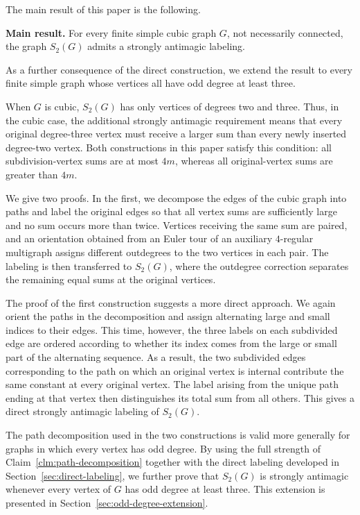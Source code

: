 \documentclass[preprint,12pt]{elsarticle}
\begin{document}
The main result of this paper is the following.

\medskip
\noindent\textbf{Main result.}
For every finite simple cubic graph \(G\), not necessarily connected, the
graph \(S_2(G)\) admits a strongly antimagic labeling.
\medskip

As a further consequence of the direct construction, we extend the result
to every finite simple graph whose vertices all have odd degree at least
three.

When \(G\) is cubic, \(S_2(G)\) has only vertices of degrees two and
three. Thus, in the cubic case, the additional strongly antimagic
requirement means that every original degree-three vertex must receive a
larger sum than every newly inserted degree-two vertex. Both constructions
in this paper satisfy this condition: all subdivision-vertex sums are at
most \(4m\), whereas all original-vertex sums are greater than \(4m\).

We give two proofs. In the first, we decompose the edges of the cubic
graph into paths and label the original edges so that all vertex sums are
sufficiently large and no sum occurs more than twice. Vertices receiving
the same sum are paired, and an orientation obtained from an Euler tour of
an auxiliary \(4\)-regular multigraph assigns different outdegrees to the
two vertices in each pair. The labeling is then transferred to \(S_2(G)\),
where the outdegree correction separates the remaining equal sums at the
original vertices.

The proof of the first construction suggests a more direct approach. We
again orient the paths in the decomposition and assign alternating large
and small indices to their edges. This time, however, the three labels on
each subdivided edge are ordered according to whether its index comes from
the large or small part of the alternating sequence. As a result, the two
subdivided edges corresponding to the path on which an original vertex is
internal contribute the same constant at every original vertex. The label
arising from the unique path ending at that vertex then distinguishes its
total sum from all others. This gives a direct strongly antimagic labeling
of \(S_2(G)\).

The path decomposition used in the two constructions is valid more
generally for graphs in which every vertex has odd degree. By using the
full strength of Claim~\ref{clm:path-decomposition} together with the
direct labeling developed in Section~\ref{sec:direct-labeling}, we further
prove that \(S_2(G)\) is strongly antimagic whenever every vertex of \(G\)
has odd degree at least three. This extension is presented in
Section~\ref{sec:odd-degree-extension}.
\end{document}
